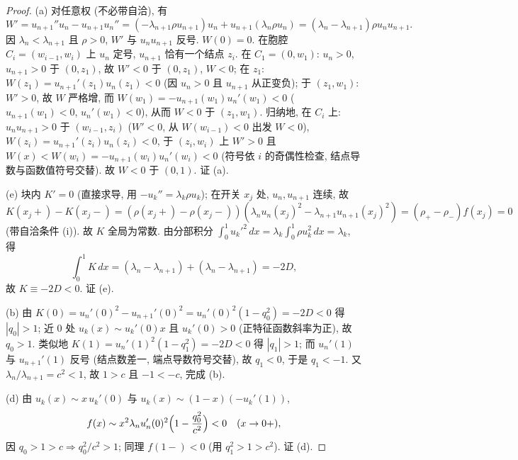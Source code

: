 \documentclass[UTF8]{ctexart}
\begin{document}
\begin{proof}
(a) 对任意权 (不必带自洽), 有
\begin{equation*}
	W'=u_{n+1}''u_n-u_{n+1}u_n''=(-\lambda_{n+1}\rho u_{n+1})u_n
	+u_{n+1}(\lambda_n\rho u_n)=(\lambda_n-\lambda_{n+1})\rho u_nu_{n+1}.
\end{equation*}
因 $\lambda_n<\lambda_{n+1}$ 且 $\rho>0$, $W'$ 与 $u_nu_{n+1}$ 反号.
$W(0)=0$. 在胞腔 $C_i=(w_{i-1},w_i)$ 上 $u_n$ 定号, $u_{n+1}$ 恰有一个结点 $z_i$.
在 $C_1=(0,w_1)$: $u_n>0$, $u_{n+1}>0$ 于 $(0,z_1)$, 故 $W'<0$ 于 $(0,z_1)$,
$W<0$; 在 $z_1$: $W(z_1)=u_{n+1}'(z_1)u_n(z_1)<0$ (因 $u_n>0$ 且 $u_{n+1}$ 从正变负);
于 $(z_1,w_1)$: $W'>0$, 故 $W$ 严格增, 而
$W(w_1)=-u_{n+1}(w_1)u_n'(w_1)<0$ ($u_{n+1}(w_1)<0$, $u_n'(w_1)<0$), 从而
$W<0$ 于 $(z_1,w_1)$. 归纳地, 在 $C_i$ 上: $u_nu_{n+1}>0$ 于 $(w_{i-1},z_i)$
($W'<0$, 从 $W(w_{i-1})<0$ 出发 $W<0$), $W(z_i)=u_{n+1}'(z_i)u_n(z_i)<0$,
于 $(z_i,w_i)$ 上 $W'>0$ 且 $W(x)<W(w_i)=-u_{n+1}(w_i)u_n'(w_i)<0$
(符号依 $i$ 的奇偶性检查, 结点导数与函数值符号交替). 故 $W<0$ 于 $(0,1)$.
证 (a).

(e) 块内 $K'=0$ (直接求导, 用 $-u_k''=\lambda_k\rho u_k$); 在开关 $x_j$ 处,
$u_n,u_{n+1}$ 连续, 故
\begin{equation*}
	K(x_j+)-K(x_j-)=(\rho(x_j+)-\rho(x_j-))(\lambda_nu_n(x_j)^2-\lambda_{n+1}u_{n+1}(x_j)^2)
	=(\rho_+-\rho_-)f(x_j)=0
\end{equation*}
(带自洽条件 (i)). 故 $K$ 全局为常数. 由分部积分
$\int_0^1 u_k'^2\,dx=\lambda_k\int_0^1\rho u_k^2\,dx=\lambda_k$, 得
\begin{equation*}
	\int_0^1 K\,dx=(\lambda_n-\lambda_{n+1})+(\lambda_n-\lambda_{n+1})=-2D,
\end{equation*}
故 $K\equiv-2D<0$. 证 (e).

(b) 由 $K(0)=u_n'(0)^2-u_{n+1}'(0)^2=u_n'(0)^2(1-q_0^2)=-2D<0$ 得
$|q_0|>1$; 近 $0$ 处 $u_k(x)\sim u_k'(0)x$ 且 $u_k'(0)>0$ (正特征函数斜率为正),
故 $q_0>1$. 类似地 $K(1)=u_n'(1)^2(1-q_1^2)=-2D<0$ 得 $|q_1|>1$; 而
$u_n'(1)$ 与 $u_{n+1}'(1)$ 反号 (结点数差一, 端点导数符号交替), 故 $q_1<0$,
于是 $q_1<-1$. 又 $\lambda_n/\lambda_{n+1}=c^2<1$, 故 $1>c$ 且 $-1<-c$,
完成 (b).

(d) 由 $u_k(x)\sim x\,u_k'(0)$ 与 $u_k(x)\sim(1-x)(-u_k'(1))$,
\begin{equation*}
	f(x)\sim x^2\lambda_nu_n'(0)^2\Bigl(1-\frac{q_0^2}{c^2}\Bigr)<0
	\quad(x\to0+),
\end{equation*}
因 $q_0>1>c\Rightarrow q_0^2/c^2>1$; 同理 $f(1-)<0$ (用 $q_1^2>1>c^2$). 证 (d).


\end{proof}
\end{document}
